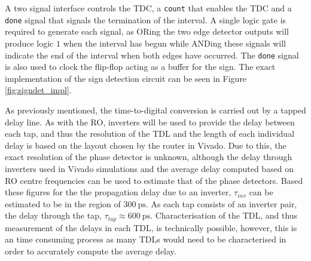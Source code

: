 A two signal interface controls the \ac{TDC}, a \texttt{count} that enables the \ac{TDC} and a \texttt{done} signal that signals the termination of the interval. A single logic gate is required to generate each signal, as ORing the two edge detector outputs will produce logic $1$ when the interval has begun while ANDing these signals will indicate the end of the interval when both edges have occurred. The \texttt{done} signal is also used to clock the flip-flop acting as a buffer for the sign. The exact implementation of the sign detection circuit can be seen in Figure \ref{fig:signdet_impl}.

As previously mentioned, the time-to-digital conversion is carried out by a tapped delay line. As with the \ac{RO}, inverters will be used to provide the delay between each tap, and thus the resolution of the \ac{TDL} and the length of each individual delay is based on the layout chosen by the router in Vivado. Due to this, the exact resolution of the phase detector is unknown, although the delay through inverters used in Vivado simulations and the average delay computed based on \ac{RO} centre frequencies can be used to estimate that of the phase detectors. Based these figures for the the propagation delay due to an inverter, $\tau_{inv}$ can be estimated to be in the region of $300~\si{\pico\second}$. As each tap consists of an inverter pair, the delay through the tap, $\tau_{tap} \approx 600~\si{\pico\second}$. Characterisation of the \ac{TDL}, and thus measurement of the delays in each \ac{TDL}, is technically possible, however, this is an time consuming process as many \ac{TDL}s would need to be characterised in order to accurately compute the average delay. 

